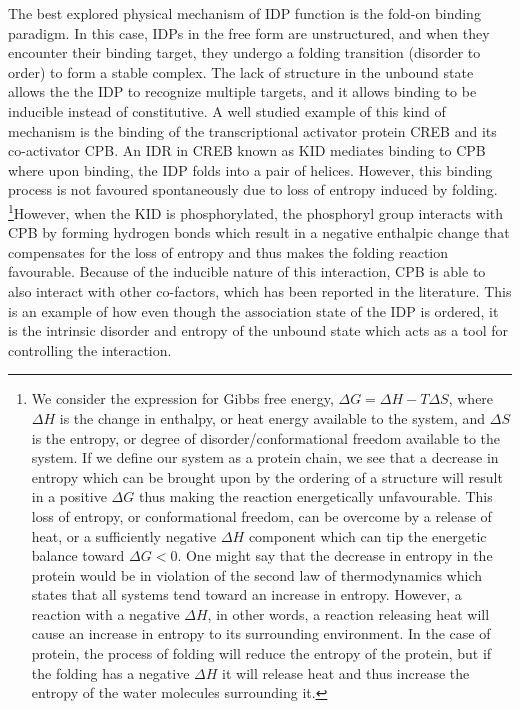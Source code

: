 The best explored physical mechanism of IDP function is the fold-on binding paradigm. In this case, IDPs in the free form are unstructured, and when they encounter their binding target, they undergo a folding transition (disorder to order) to form a stable complex. The lack of structure in the unbound state allows the the IDP to recognize multiple targets, and it allows binding to be inducible instead of constitutive. A well studied example of this kind of mechanism is the binding of the transcriptional activator protein CREB and its co-activator CPB. An IDR in CREB known as KID mediates binding to CPB where upon binding, the IDP folds into a pair of helices. However, this binding process is not favoured spontaneously due to loss of entropy induced by folding. \footnote{We consider the expression for Gibbs free energy, $\Delta G = \Delta H - T\Delta S$, where $\Delta H$ is the change in enthalpy, or heat energy available to the system, and $\Delta S$ is the entropy, or degree of disorder/conformational freedom available to the system. If we define our system as a protein chain, we see that a decrease in entropy which can be brought upon by the ordering of a structure will result in a positive $\Delta G$ thus making the reaction energetically unfavourable. This loss of entropy, or conformational freedom, can be overcome by a release of heat, or a sufficiently negative $\Delta H$ component which can tip the energetic balance toward $\Delta G < 0$. One might say that the decrease in entropy in the protein would be in violation of the second law of thermodynamics which states that all systems tend toward an increase in entropy. However, a reaction with a negative $\Delta H$, in other words, a reaction releasing heat will cause an increase in entropy to its surrounding environment. In the case of protein, the process of folding will reduce the entropy of the protein, but if the folding has a negative $\Delta H$ it will release heat and thus increase the entropy of the water molecules surrounding it.}However, when the KID is phosphorylated, the phosphoryl group interacts with CPB by forming hydrogen bonds which result in a negative enthalpic change that compensates for the loss of entropy and thus makes the folding reaction favourable. Because of the inducible nature of this interaction, CPB is able to also interact with other co-factors, which has been reported in the literature. \cite{radhakrishnan1997solution} This is an example of how even though the association state of the IDP is ordered, it is  the intrinsic disorder and entropy of the unbound state which acts as a tool for controlling the interaction. \\


